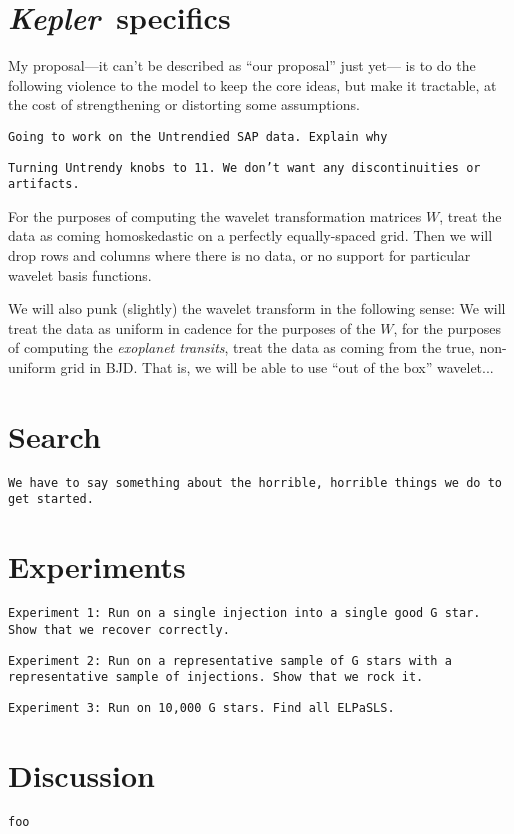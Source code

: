 \documentclass[12pt,letterpaper]{article}
\newcommand{\warning}[1]{\texttt{#1}}
\newcommand{\project}[1]{\textsl{#1}}
\newcommand{\Kepler}{\project{Kepler}}
\newcommand{\weightmatrix}{W}
\begin{document}
\section{\Kepler\ specifics}

My proposal---it can't be described as ``our proposal'' just yet---%
is to do the following violence to the model to keep the core ideas,
but make it tractable, at the cost of strengthening or distorting some assumptions.

\warning{Going to work on the Untrendied SAP data.
         Explain why}

\warning{Turning Untrendy knobs to 11.
         We don't want any discontinuities or artifacts.}

For the purposes of computing the wavelet transformation matrices $\weightmatrix$,
treat the data as coming homoskedastic on a perfectly equally-spaced grid.
Then we will drop rows and columns where there is no data,
or no support for particular wavelet basis functions.

We will also punk (slightly) the wavelet transform in the following sense:
We will treat the data as uniform in cadence for the purposes
of the $\weightmatrix$, for the purposes of computing the \emph{exoplanet transits},
treat the data as coming from the true, non-uniform grid in BJD.
That is, we will be able to use ``out of the box'' wavelet...

\section{Search}

\warning{We have to say something about the horrible, horrible things we do to get started.}

\section{Experiments}

\warning{Experiment 1: Run on a single injection into a single good G star.
         Show that we recover correctly.}

\warning{Experiment 2: Run on a representative sample of G stars with a representative sample of injections.
         Show that we rock it.}

\warning{Experiment 3: Run on 10,000 G stars.
         Find all ELPaSLS.}

\section{Discussion}

\warning{foo}
\end{document}
